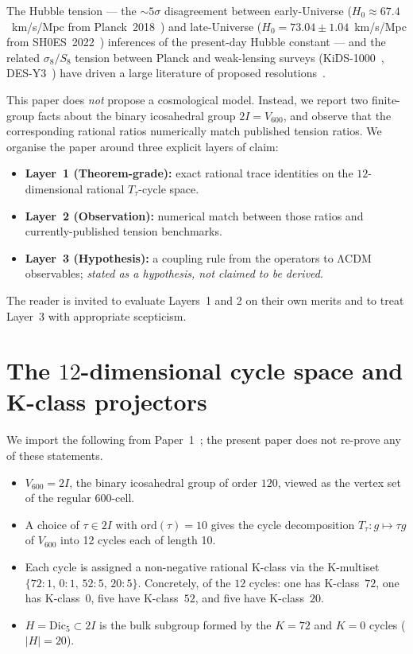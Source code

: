 \documentclass[11pt]{article}
\newcommand{\twoI}{2I}
\newcommand{\Vsixhundred}{V_{600}}
\newcommand{\Dicfive}{\mathrm{Dic}_5}
\newcommand{\Ttau}{T_{\tau}}
\newcommand{\Hzero}{H_0}
\newcommand{\sigeight}{\sigma_8}
\begin{document}
The Hubble tension --- the $\sim 5\sigma$ disagreement between
early-Universe ($\Hzero \approx 67.4$~km/s/Mpc from
Planck~2018~\citep{Planck2020}) and late-Universe
($\Hzero = 73.04 \pm 1.04$~km/s/Mpc from
SH0ES~2022~\citep{Riess2022SH0ES}) inferences of the present-day
Hubble constant --- and the related $\sigeight / S_8$ tension between
Planck and weak-lensing surveys (KiDS-1000~\citep{Heymans2021KiDS},
DES-Y3~\citep{Abbott2022DESY3}) have driven a large literature of
proposed
resolutions~\citep{DiValentinoEtAl2021Tension}.

This paper does \emph{not} propose a cosmological model. Instead, we
report two finite-group facts about the binary icosahedral
group $\twoI = \Vsixhundred$, and observe that
the corresponding rational ratios numerically match published tension
ratios. We organise the paper around three explicit layers of claim:

\begin{itemize}[leftmargin=2em]
  \item \textbf{Layer~1 (Theorem-grade):} exact rational trace
  identities on the $12$-dimensional rational $\Ttau$-cycle space.
  \item \textbf{Layer~2 (Observation):} numerical match between those
  ratios and currently-published tension benchmarks.
  \item \textbf{Layer~3 (Hypothesis):} a coupling rule from the
  operators to ΛCDM observables; \emph{stated as a hypothesis, not
  claimed to be derived}.
\end{itemize}

The reader is invited to evaluate Layers~1 and 2 on their own merits
and to treat Layer~3 with appropriate scepticism.

\section{The $12$-dimensional cycle space and K-class projectors}\label{sec:setup}

We import the following from Paper~1~\citep{V600Paper1}; the present
paper does not re-prove any of these statements.

\begin{itemize}[leftmargin=2em]
\item $\Vsixhundred = \twoI$, the binary icosahedral group of order
$120$, viewed as the vertex set of the regular $600$-cell.
\item A choice of $\tau \in \twoI$ with $\mathrm{ord}(\tau) = 10$
gives the cycle decomposition $T_\tau : g \mapsto \tau g$ of
$\Vsixhundred$ into 12 cycles each of length 10.
\item Each cycle is assigned a non-negative rational K-class via the
K-multiset $\{72{:}1,\,0{:}1,\,52{:}5,\,20{:}5\}$. Concretely, of
the $12$ cycles: one has K-class~$72$, one has K-class~$0$, five
have K-class~$52$, and five have K-class~$20$.
\item $H = \Dicfive \subset \twoI$ is the bulk subgroup formed by the
$K=72$ and $K=0$ cycles ($|H| = 20$).
\end{itemize}
\end{document}

